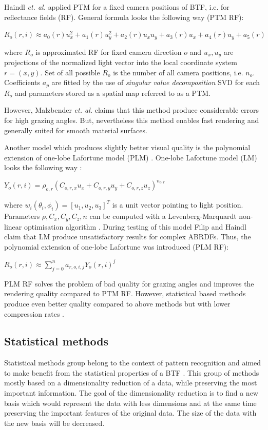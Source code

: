 Haindl  \emph{et. al.} \cite{haindl} applied PTM for a fixed camera positions of BTF, i.e. for reflectance fields (RF).
General formula looks the following way (PTM RF):

{\centering$R_{o}(r,i)\approx a_{0}(r)u_{x}^2+a_{1}(r)u_{y}^2+a_{2}(r)u_{x}u_{y}+a_{3}(r)u_{x}+a_{4}(r)u_{y}+a_{5}(r)$\\}

 where $R_{o}$ is approximated RF for fixed camera direction $o$ and $u_{x},u_{y}$ are projections of the normalized light vector into the local coordinate system $r=(x,y)$.
 Set of all possible $R_{o}$ is the number of all camera positions, i.e. $n_{o}$. 
 Coefficients $a_{p}$ are fitted by the use of \emph{singular value decomposition} SVD for each $R_{o}$ and parameters stored as a spatial map referred to as a PTM.
 
 However, Malzbender  \emph{et. al.} \cite{PTM} claims that this method produce considerable errors for high grazing angles. 
 But, nevertheless this method enables fast rendering and generally suited for smooth material surfaces.
 
 Another model which produces slightly better visual quality is the polynomial extension of one-lobe Lafortune model (PLM) \cite{haindl}.
One-lobe Lafortune model (LM) looks the following way \cite{plm}:

{\centering$Y_{o} (r,i) = \rho_{o,r}(C_{o,r,x}u_{x}+C_{o,r,y}u_{y}+C_{o,r,z}u_{z})_{ }^{n_{o,r}}$\\}

where $w_{i}(\theta_{i}, \phi_{i})=[u_{1},u_{2},u_{3}]^{T}$ is a unit vector pointing to light position.
Parameters $\rho,C_{x},C_{y},C_{z},n$ can be computed with a Levenberg-Marquardt non-linear optimisation algorithm \cite{plm}. 
During testing of this model Filip and Haindl \cite{plm} claim that LM produce unsatisfactory results for complex ABRDFs.
 Thus, the polynomial extension of one-lobe Lafortune was introduced (PLM RF):

{\centering$R_{o}(r,i)\approx  \sum_{j=0}^{n} a_{r,o,i,j}Y_{o}(r,i)^j$\\}



PLM RF solves the problem of bad quality for grazing angles and improves the rendering quality compared to PTM RF.
However, statistical based methods produce even better quality compared to above methods but with lower compression rates \cite{haindl}.



  \subsection{Statistical methods}
\label{section:stat_methods}
 Statistical methods group belong to the context of pattern recognition and aimed to make benefit from the statistical properties of a BTF \cite{schneider2004}.
This group of methods mostly based on a dimensionality reduction of a data, while preserving the most important information.
The goal of the dimensionality reduction is to find a new basis which would represent the data with less dimensions and at the same time preserving the important features of the original data.
 The size of the data with the new basis will be decreased.

